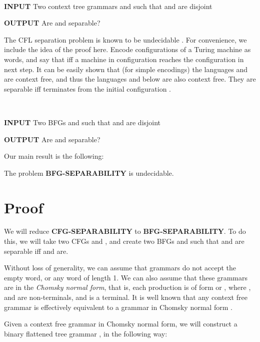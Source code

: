\documentclass{article}
\begin{document}
\begin{problem} \label{cflsep} {\ }

{\bf INPUT} Two context tree grammars  and  such that  and 
are disjoint

{\bf OUTPUT} Are  and  separable?
\end{problem}

The CFL separation problem is known to be undecidable \cite{hunt, szymanski}. For
convenience, we include the idea of the proof here. Encode configurations of a 
Turing machine  as words, and say that  iff a machine
in configuration  reaches the configuration  in next step. It can be
easily shown 
that (for simple encodings)
the languages  and 
are context free, and thus the languages  and  below are also context free.
They are separable iff  terminates from the initial configuration .


\begin{problem} \label{flattensep} {\ }

{\bf INPUT} Two BFGs  and  such that  and  are disjoint

{\bf OUTPUT} Are  and  separable?
\end{problem}

Our main result is the following:

\begin{theorem} \label{tflattensep}
The problem {\bf BFG-SEPARABILITY} is undecidable.
\end{theorem}

\section{Proof}

We will reduce {\bf CFG-SEPARABILITY} to {\bf BFG-SEPARABILITY}. To do this,
we will take two CFGs  and , and create two BFGs  and 
such that  and  are separable iff  and  are.

Without loss of generality, we can assume that grammars  do not accept the
empty word, or any word of length 1. We can also assume that these grammars
are in the \emph{Chomsky normal form}, that is, each production is of form
 or , where ,  and  are non-terminals,
and  is a terminal. It is well known that any context free grammar is effectively
equivalent to a grammar in Chomsky normal form \cite{hu79}.

Given a context free grammar 
in Chomsky normal form, we will construct a 
binary flattened
tree grammar , in the following way:
\end{document}
